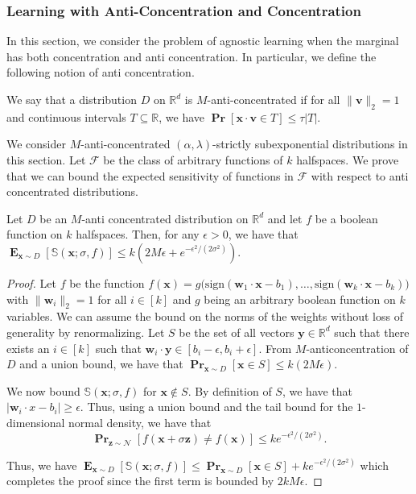 \documentclass{theoretics}
\newcommand\twonorm[1]{\|#1\|_2}
\renewcommand\vec[1]{\mathbf{#1}}
\DeclareMathOperator*{\pr}{\mathbf{Pr}}
\DeclareMathOperator*{\E}{\mathbf{E}}
\newcommand{\R}{\mathbb{R}}
\newcommand{\sign}{\mathrm{sign}}
\newcommand{\1}{\Ind}
\newcommand{\x}{\vec x}
\renewcommand{\vv}{\vec v}
\newcommand{\vw}{\vec w}
\newcommand{\z}{\vec z}
\newcommand{\F}{\mathcal{F}}
\newcommand{\Gauss}{\mathcal{N}}
\begin{document}
\subsubsection{Learning with Anti-Concentration and Concentration}
In this section, we consider the problem of agnostic learning when the marginal has both concentration and anti concentration. In particular, we define the following notion of anti concentration.
\begin{definition}
    We say that a distribution $D$ on $\R^d$ is $M$-anti-concentrated if for all $\twonorm{\vv}=1$ and continuous intervals $T\subseteq \R$, we have  
        \(
          \pr[\x\cdot \vv\in T ]\leq \tau|T|.
        \)
\end{definition}

We consider $M$-anti-concentrated $(\alpha,\lambda)$-strictly subexponential distributions in this section. Let $\F$ be the class of arbitrary functions of $k$ halfspaces. We prove that we can bound the expected sensitivity of functions in $\F$ with respect to anti concentrated distributions.

\begin{lemma}
\label{lem:expected_sens_anticonc_halfspace}
    Let $D$ be an $M$-anti concentrated distribution on $\R^{d}$ and let $f$ be a boolean function on $k$ halfspaces. Then, for any $\epsilon>0$, we have that $\E_{\x\sim D}[\mathbb{S}(\x;\sigma,f)]\leq k(2M\epsilon+ e^{-\epsilon^2/(2\sigma^2)}) $.
\end{lemma}
\begin{proof}
    Let $f$ be the function $f(\x)=g\bigl(\sign(\vw_1\cdot\x-b_1),\dots,\sign(\vw_k\cdot \x-b_k)\bigr)$ with $\twonorm{\vw_i}=1$ for all $i\in [k]$ and $g$ being an arbitrary boolean function on $k$ variables. We can assume the bound on the norms of the weights without loss of generality by renormalizing. Let $S$ be the set of all vectors $\vec y\in \R^d$ such that there exists an $i\in[k]$ such that $\vw_i\cdot \vec y\in[b_i-\epsilon,b_i+\epsilon]$. From $M$-anticoncentration of $D$ and a union bound, we have that $\pr_{\x\sim D}[\x\in S]\leq k(2M\epsilon)$.

    We now bound $\mathbb{S}(\x;\sigma,f)$ for $\x\notin S$. By definition of $S$, we have that $|\vw_i\cdot x-b_i|\geq \epsilon$. Thus, using a union bound and the tail bound for the $1$-dimensional normal density, we have that 
    \[
    \pr_{\z\sim \Gauss}[f(\x+\sigma\z)\neq f(\x)]\leq ke^{-\epsilon^2/(2\sigma^2)}.
    \]

    Thus, we have $\E_{\x\sim D}[\mathbb{S}(\x;\sigma,f)]\leq \pr_{\x\sim D}[\x\in S]+ke^{-\epsilon^2/(2\sigma^2)}$ which completes the proof since the first term is bounded by $2kM\epsilon$.
\end{proof}
\end{document}
